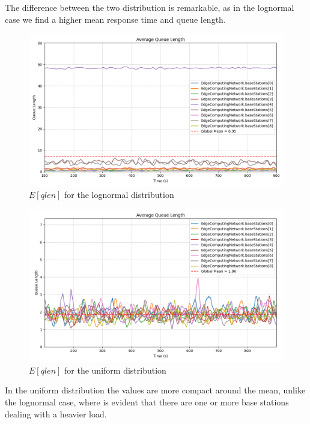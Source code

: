 \documentclass{report}
\begin{document}
The difference between the two distribution is remarkable, as in the lognormal case we find a higher mean response time and queue length.

\begin{figure}[H]
    \centering
    \includegraphics[width=\textwidth]{img/plots/log_1e3_A/qlen.png}
    \caption{$E[qlen]$ for the lognormal distribution}
\end{figure}

\begin{figure}[H]
    \centering
    \includegraphics[width=\textwidth]{img/plots/uni_1e3_A/qlen.png}
    \caption{$E[qlen]$ for the uniform distribution}
\end{figure}

In the uniform distribution the values are more compact around the mean, unlike the lognormal case, where is evident that there are one or more base stations dealing with a heavier load.
\end{document}
